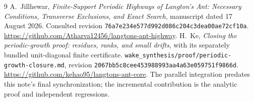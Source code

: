 \documentclass[11pt]{article}
\begin{document}
\begin{thebibliography}{9}
 A.~Jillhewar,
\emph{Finite-Support Periodic Highways of Langton's Ant: Necessary Conditions,
Transverse Exclusions, and Exact Search}, manuscript dated 17 August 2026.
Consulted revision \texttt{76a7e234e577d992d086c204c3dea00ae72cf10a}.
\url{https://github.com/Atharva12456/langtons-ant-highway}.
 H.~Ke,
\emph{Closing the periodic-growth proof: residues, ranks, and small drifts},
with its separately bundled unit-diagonal finite certificate.
\texttt{wake\_synthesis/proof/periodic-growth-closure.md}, revision
\texttt{2067bb5c8cee453988993aa4a63e059751f9866d}.
\url{https://github.com/kehao95/langtons-ant-core}.
The parallel integration predates this note's final synchronization; the
incremental contribution is the analytic proof and independent regressions.
\end{thebibliography}
\end{document}
